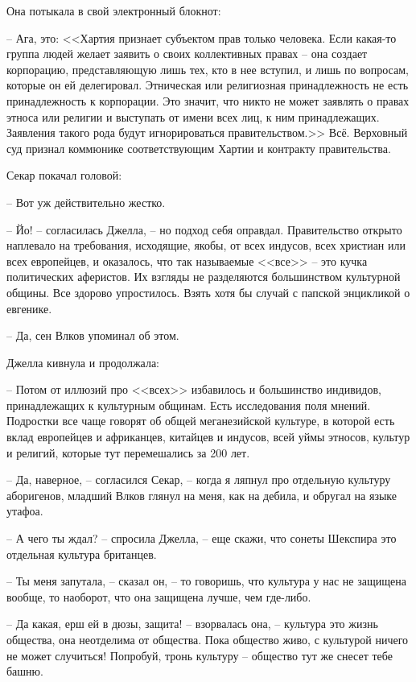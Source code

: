 Она потыкала в свой электронный блокнот:

-- Ага, это: <<Хартия признает субъектом прав только человека. Если какая-то группа людей желает заявить о своих коллективных правах -- она создает корпорацию, представляющую лишь тех, кто в нее вступил, и лишь по вопросам, которые он ей делегировал. Этническая или религиозная принадлежность не есть принадлежность к корпорации. Это значит, что никто не может заявлять о правах этноса или религии и выступать от имени всех лиц, к ним принадлежащих. Заявления такого рода будут игнорироваться правительством.>> Всё. Верховный суд признал коммюнике соответствующим Хартии и контракту правительства.

Секар покачал головой:

-- Вот уж действительно жестко.

-- Йо! -- согласилась Джелла, -- но подход себя оправдал. Правительство открыто наплевало на требования, исходящие, якобы, от всех индусов, всех христиан или всех европейцев, и оказалось, что так называемые <<все>> -- это кучка политических аферистов. Их взгляды не разделяются большинством культурной общины. Все здорово упростилось. Взять хотя бы случай с папской энцикликой о евгенике.

-- Да, сен Влков упоминал об этом.

Джелла кивнула и продолжала:

-- Потом от иллюзий про <<всех>> избавилось и большинство индивидов, принадлежащих к культурным общинам. Есть исследования поля мнений. Подростки все чаще говорят об общей меганезийской культуре, в которой есть вклад европейцев и африканцев, китайцев и индусов, всей уймы этносов, культур и религий, которые тут перемешались за 200 лет.

-- Да, наверное, -- согласился Секар, -- когда я ляпнул про отдельную культуру аборигенов, младший Влков глянул на меня, как на дебила, и обругал на языке утафоа.

-- А чего ты ждал? -- спросила Джелла, -- еще скажи, что сонеты Шекспира это отдельная культура британцев.

-- Ты меня запутала, -- сказал он, -- то говоришь, что культура у нас не защищена вообще, то наоборот, что она защищена лучше, чем где-либо.

-- Да какая, ерш ей в дюзы, защита! -- взорвалась она, -- культура это жизнь общества, она неотделима от общества. Пока общество живо, с культурой ничего не может случиться! Попробуй, тронь культуру -- общество тут же снесет тебе башню.

